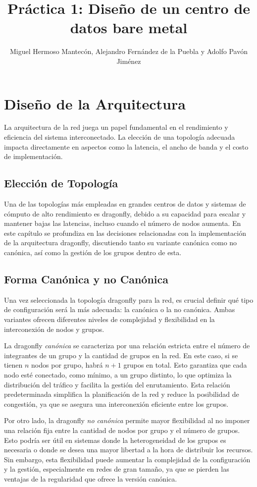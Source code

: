 \documentclass[%
    school=etsisi,%
    degree=61TI,%
]{upm-report}
\title{Práctica 1: Diseño de un centro de datos bare metal}
\author{Miguel Hermoso Mantecón, Alejandro Fernández de la Puebla y Adolfo Pavón Jiménez}
\begin{document}
\chapter{Diseño de la Arquitectura}
\label{ch:diseño-arquitectura}

La arquitectura de la red juega un papel fundamental en el rendimiento y eficiencia del sistema interconectado. La elección de una topología adecuada impacta directamente en aspectos como la latencia, el ancho de banda y el costo de implementación. 

\section{Elección de Topología}
\label{sec:elección-topología}

Una de las topologías más empleadas en grandes centros de datos y sistemas de cómputo de alto rendimiento es dragonfly, debido a su capacidad para escalar y mantener bajas las latencias, incluso cuando el número de nodos aumenta. En este capítulo se profundiza en las decisiones relacionadas con la implementación de la arquitectura dragonfly, discutiendo tanto su variante canónica como no canónica, así como la gestión de los grupos dentro de esta.

\section{Forma Canónica y no Canónica}
\label{sec:dragonfly}

Una vez seleccionada la topología dragonfly para la red, es crucial definir qué tipo de configuración será la más adecuada: la canónica o la no canónica. Ambas variantes ofrecen diferentes niveles de complejidad y flexibilidad en la interconexión de nodos y grupos.

La dragonfly \textit{canónica} se caracteriza por una relación estricta entre el número de integrantes de un grupo y la cantidad de grupos en la red. En este caso, si se tienen $n$ nodos por grupo, habrá $n+1$ grupos en total. Esto garantiza que cada nodo esté conectado, como mínimo, a un grupo distinto, lo que optimiza la distribución del tráfico y facilita la gestión del enrutamiento. Esta relación predeterminada simplifica la planificación de la red y reduce la posibilidad de congestión, ya que se asegura una interconexión eficiente entre los grupos.

Por otro lado, la dragonfly \textit{no canónica} permite mayor flexibilidad al no imponer una relación fija entre la cantidad de nodos por grupo y el número de grupos. Esto podría ser útil en sistemas donde la heterogeneidad de los grupos es necesaria o donde se desea una mayor libertad a la hora de distribuir los recursos. Sin embargo, esta flexibilidad puede aumentar la complejidad de la configuración y la gestión, especialmente en redes de gran tamaño, ya que se pierden las ventajas de la regularidad que ofrece la versión canónica.
\end{document}
